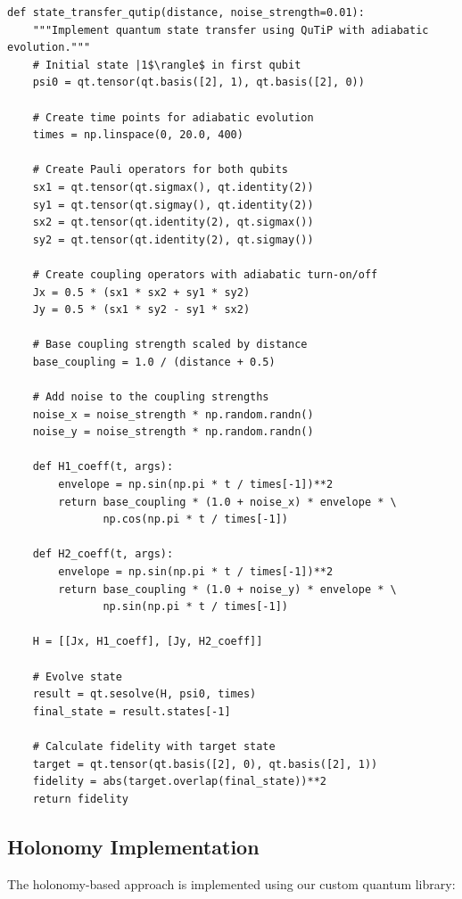 \documentclass[12pt]{article}
\begin{document}
\begin{lstlisting}[caption=Implementation of quantum state transfer methods]
def state_transfer_qutip(distance, noise_strength=0.01):
    """Implement quantum state transfer using QuTiP with adiabatic evolution."""
    # Initial state |1$\rangle$ in first qubit
    psi0 = qt.tensor(qt.basis([2], 1), qt.basis([2], 0))
    
    # Create time points for adiabatic evolution
    times = np.linspace(0, 20.0, 400)
    
    # Create Pauli operators for both qubits
    sx1 = qt.tensor(qt.sigmax(), qt.identity(2))
    sy1 = qt.tensor(qt.sigmay(), qt.identity(2))
    sx2 = qt.tensor(qt.identity(2), qt.sigmax())
    sy2 = qt.tensor(qt.identity(2), qt.sigmay())
    
    # Create coupling operators with adiabatic turn-on/off
    Jx = 0.5 * (sx1 * sx2 + sy1 * sy2)
    Jy = 0.5 * (sx1 * sy2 - sy1 * sx2)
    
    # Base coupling strength scaled by distance
    base_coupling = 1.0 / (distance + 0.5)
    
    # Add noise to the coupling strengths
    noise_x = noise_strength * np.random.randn()
    noise_y = noise_strength * np.random.randn()
    
    def H1_coeff(t, args):
        envelope = np.sin(np.pi * t / times[-1])**2
        return base_coupling * (1.0 + noise_x) * envelope * \
               np.cos(np.pi * t / times[-1])
        
    def H2_coeff(t, args):
        envelope = np.sin(np.pi * t / times[-1])**2
        return base_coupling * (1.0 + noise_y) * envelope * \
               np.sin(np.pi * t / times[-1])
    
    H = [[Jx, H1_coeff], [Jy, H2_coeff]]
    
    # Evolve state
    result = qt.sesolve(H, psi0, times)
    final_state = result.states[-1]
    
    # Calculate fidelity with target state
    target = qt.tensor(qt.basis([2], 0), qt.basis([2], 1))
    fidelity = abs(target.overlap(final_state))**2
    return fidelity
\end{lstlisting}

\subsection{Holonomy Implementation}
The holonomy-based approach is implemented using our custom quantum library:
\end{document}

